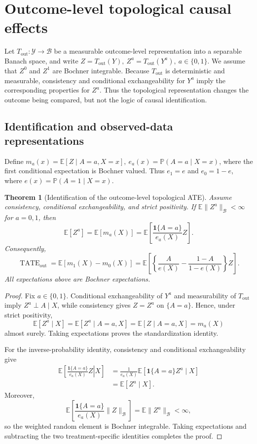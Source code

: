 \documentclass[11pt,a4paper]{article}
\theoremstyle{plain}
\newtheorem{theorem}{Theorem}[section]
\theoremstyle{definition}
\theoremstyle{remark}
\newcommand{\1}{\mathbbm{1}}
\begin{document}
\section{Outcome-level topological causal effects}
\label{sec:outcome}

Let \(T_{\mathrm{out}}:\mathcal Y\to\mathcal B\) be a measurable outcome-level representation into a separable Banach space, and write \(Z=T_{\mathrm{out}}(Y), \ Z^a=T_{\mathrm{out}}(Y^a),\ a\in\{0,1\}\). We assume that \(Z^0\) and \(Z^1\) are Bochner integrable. Because \(T_{\mathrm{out}}\) is deterministic and measurable, consistency and conditional exchangeability for \(Y^a\) imply the corresponding properties for \(Z^a\). Thus the topological representation changes the outcome being compared, but not the logic of causal identification.

\subsection{Identification and observed-data representations}
\label{subsec:identification-functional-tate}

Define \(m_a(x)=\mathbb E[Z\mid A=a,X=x], \ e_a(x)=\mathbb P(A=a\mid X=x)\), where the first conditional expectation is Bochner valued. Thus \(e_1=e\) and \(e_0=1-e\), where \(e(x)=\mathbb P(A=1\mid X=x)\).

\begin{theorem}[Identification of the outcome-level topological ATE]
\label{thm:identification-outcome-tate}
Assume consistency, conditional exchangeability, and strict positivity. If \(\mathbb E\|Z^a\|_{\mathcal B}<\infty\) for \(a=0,1\), then
\[
\mathbb E[Z^a]
=
\mathbb E[m_a(X)]
=
\mathbb E\left[
\frac{\mathbf 1\{A=a\}}{e_a(X)}Z
\right].
\]
Consequently,
\[
\operatorname{TATE}_{\mathrm{out}}
=
\mathbb E[m_1(X)-m_0(X)]
=
\mathbb E\left[
\left\{
\frac{A}{e(X)}
-
\frac{1-A}{1-e(X)}
\right\}Z
\right].
\]
All expectations above are Bochner expectations.
\end{theorem}

\begin{proof}
Fix \(a\in\{0,1\}\). Conditional exchangeability of \(Y^a\) and measurability of \(T_{\mathrm{out}}\) imply \(Z^a\perp A\mid X\), while consistency gives \(Z=Z^a\) on \(\{A=a\}\). Hence, under strict positivity,
\[
\mathbb E[Z^a\mid X]
=
\mathbb E[Z^a\mid A=a,X]
=
\mathbb E[Z\mid A=a,X]
=
m_a(X)
\]
almost surely. Taking expectations proves the standardization identity.

For the inverse-probability identity, consistency and conditional exchangeability give
\[
\begin{aligned}
\mathbb E\left[
\left.
\frac{\mathbf 1\{A=a\}}{e_a(X)}Z
\right|X
\right]
&=
\frac{1}{e_a(X)}
\mathbb E\left[
\mathbf 1\{A=a\}Z^a\mid X
\right] \\
&=
\mathbb E[Z^a\mid X].
\end{aligned}
\]
Moreover,
\[
\mathbb E\left[
\frac{\mathbf 1\{A=a\}}{e_a(X)}
\|Z\|_{\mathcal B}
\right]
=
\mathbb E\|Z^a\|_{\mathcal B}<\infty,
\]
so the weighted random element is Bochner integrable. Taking
expectations and subtracting the two treatment-specific identities completes the proof.
\end{proof}
\end{document}
